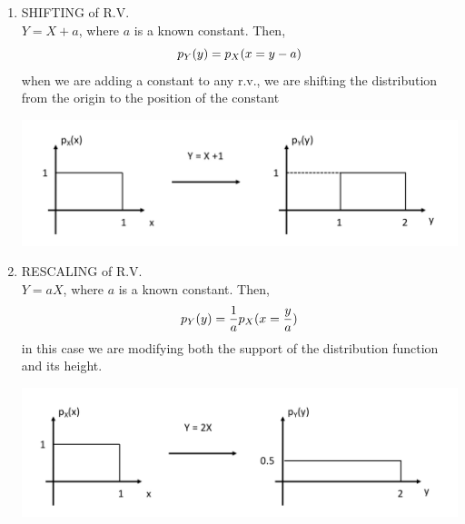 \begin{enumerate}
    \item SHIFTING of R.V. \\
    $ Y = X+a$, where $a$ is a known constant. Then,
    $$ p_Y(y) =  p_X(x = y-a) $$
    when we are adding a constant to any r.v., we are shifting the distribution from the origin to the position of the constant
    
    \begin{center}
    \includegraphics[scale=.3]{Figures/Fig15.png}
    \end{center}
    
    
    \item RESCALING of R.V.\\
    $ Y = aX$, where $a$ is a known constant. Then,
    $$ p_Y(y) =  \frac{1}{a} p_X(x = \frac{y}{a}) $$
    in this case we are modifying both the support of the distribution function and its height.
    
    \begin{center}
    \includegraphics[scale=.3]{Figures/Fig16.png}
    \end{center}
    
\end{enumerate}
